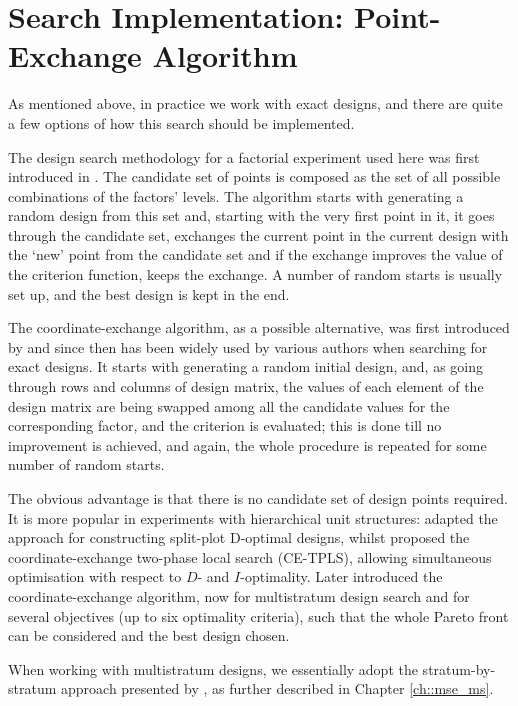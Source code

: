 \section{Search Implementation: Point-Exchange Algorithm}

As mentioned above, in practice we work with exact designs, and there are quite a few options of how this search should be implemented.  

The design search methodology for a factorial experiment used here was first introduced in \citet{fedorov1972theory}. The candidate set of points is composed as the set of all possible combinations of the factors' levels. The algorithm starts with generating a random design from this set and, starting with the very first point in it, it goes through the candidate set, exchanges the current point in the current design with the `new' point from the candidate set and if the exchange improves the value of the criterion function, keeps the exchange. A number of random starts is usually set up, and the best design is kept in the end.

The coordinate-exchange algorithm, as a possible alternative, was first introduced by \cite{Meyer1995Coordinate} and since then has been widely used by various authors when searching for exact designs. It starts with generating a random initial design, and, as going through rows and columns of design matrix, the values of each element of the design matrix are being swapped among all the candidate values for the corresponding factor, and the criterion is evaluated; this is done till no improvement is achieved, and again, the whole procedure is repeated for some number of random starts. 

The obvious advantage is that there is no candidate set of design points required. It is more popular in experiments with hierarchical unit structures: \cite{Jones2007candidate} adapted the approach for constructing split-plot D-optimal designs, whilst \cite{Sambo2014Coordinate} proposed the coordinate-exchange two-phase local search (CE-TPLS), allowing simultaneous optimisation with respect to $D$- and $I$-optimality. Later \cite{Borrotti2016Multi} introduced the coordinate-exchange algorithm, now for multistratum design search and for several objectives (up to six optimality criteria), such that the whole Pareto front can be considered and the best design chosen.  

When working with multistratum designs, we essentially adopt the stratum-by-stratum approach presented by \cite{Trinca2016SPinference}, as further described in Chapter \ref{ch::mse_ms}. 






